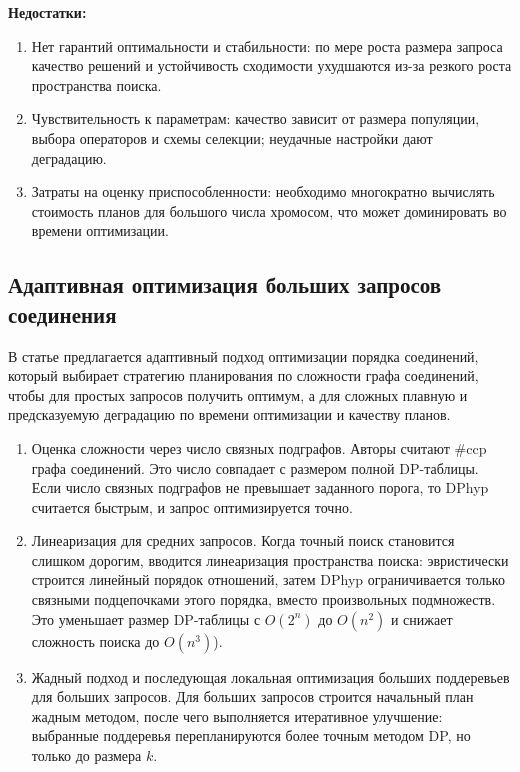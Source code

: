 \textbf{Недостатки:}
\begin{enumerate}
    \item Нет гарантий оптимальности и стабильности: по мере роста размера запроса качество решений и устойчивость сходимости ухудшаются из-за резкого роста пространства поиска.
    \item Чувствительность к параметрам: качество зависит от размера популяции, выбора операторов и схемы селекции; неудачные настройки дают деградацию.
    \item Затраты на оценку приспособленности: необходимо многократно вычислять стоимость планов для большого числа хромосом, что может доминировать во времени оптимизации.
\end{enumerate}

\subsection{Адаптивная оптимизация больших запросов соединения}

В статье \cite{Adaptive} предлагается адаптивный подход оптимизации порядка соединений,
который выбирает стратегию планирования по сложности графа соединений,
чтобы для простых запросов получить оптимум, а для сложных плавную и предсказуемую деградацию по времени оптимизации и качеству планов.
\par

\begin{enumerate}
    \item Оценка сложности через число связных подграфов.
    Авторы считают \#ccp графа соединений. Это число совпадает с размером полной DP-таблицы. 
    Если число связных подграфов не превышает заданного порога, то DPhyp считается быстрым,
    и запрос оптимизируется точно.
    \item Линеаризация для средних запросов.
    Когда точный поиск становится слишком дорогим, вводится линеаризация пространства поиска:
    эвристически строится линейный порядок отношений, затем DPhyp ограничивается только связными подцепочками этого порядка,
    вместо произвольных подмножеств. Это уменьшает размер DP-таблицы с $O(2^n)$ до $O(n^2)$ и снижает сложность поиска до $O(n^3)$).
    \item Жадный подход и последующая локальная оптимизация больших поддеревьев для больших запросов.
    Для больших запросов строится начальный план жадным методом, после чего выполняется итеративное улучшение:
    выбранные поддеревья перепланируются более точным методом DP, но только до размера $k$.
\end{enumerate}

